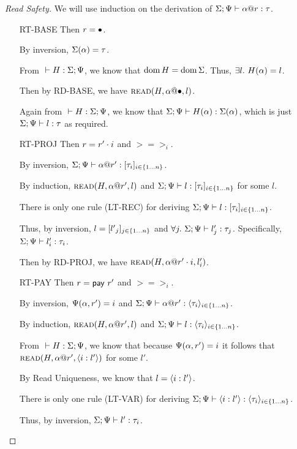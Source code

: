 \begin{proof}[Read Safety]
  We will use induction on the derivation of ${\Sigma;\Psi} \vdash {{\alpha}@{r}} : {\tau}$.
  \begin{itemize}
    \item[\textsc{RT-BASE}] Then $r = \bullet$.

      By inversion, $\Sigma(\alpha)=\tau$.

      From ${} \vdash {H} : {\Sigma;\Psi}$, we know that $\operatorname{dom}{H}=\operatorname{dom}{\Sigma}$.
      Thus, $\exists l.~H(\alpha)=l$.

      Then by \textsc{RD-BASE}, we have $\textsc{read}({H},{{\alpha}@{\bullet}},{l})$.

      Again from ${} \vdash {H} : {\Sigma;\Psi}$, we know that ${\Sigma;\Psi} \vdash {H(\alpha)} : {\Sigma(\alpha)}$,
      which is just ${\Sigma;\Psi} \vdash {l} : {\tau}$ as required.
    \item[\textsc{RT-PROJ}] Then $r = {r'}\cdot{i}$ and $\gt = \gt_i$.

      By inversion, ${\Sigma;\Psi} \vdash {{\alpha}@{r'}} : {[{{\tau}_{i}}]_{{i} \in \{1 \ldots {n}\} }}$.

      By induction, $\textsc{read}({H},{{\alpha}@{r'}},{l})$
      and ${\Sigma;\Psi} \vdash {l} : {[{{\tau}_{i}}]_{{i} \in \{1 \ldots {n}\} }}$ for some $l$.

      There is only one rule (\textsc{LT-REC}) for deriving ${\Sigma;\Psi} \vdash {l} : {[{{\tau}_{i}}]_{{i} \in \{1 \ldots {n}\} }}$.

      Thus, by inversion, $l = [{{l'}_{j}}]_{{j} \in \{1 \ldots {n}\} }$ 
      and $\forall j.~{\Sigma;\Psi} \vdash {l'_j} : {\tau_j}$.
      Specifically, ${\Sigma;\Psi} \vdash {l'_i} : {\tau_i}$.

      Then by \textsc{RD-PROJ}, we have $\textsc{read}({H},{{\alpha}@{{r'}\cdot{i}}},{l'_i})$.
    \item[\textsc{RT-PAY}] Then $r = \mathsf{pay}~{r'}$ and $\gt = \gt_i$.

      By inversion, $\Psi(\alpha,r')=i$ and ${\Sigma;\Psi} \vdash {{\alpha}@{r'}} : {\langle{{\tau}_{i}}\rangle_{{i} \in \{1 \ldots {n}\} }}$.

      By induction, $\textsc{read}({H},{{\alpha}@{r'}},{l})$
      and ${\Sigma;\Psi} \vdash {l} : {\langle{{\tau}_{i}}\rangle_{{i} \in \{1 \ldots {n}\} }}$.

      From ${} \vdash {H} : {\Sigma;\Psi}$, we know that because $\Psi(\alpha,r')=i$
      it follows that $\textsc{read}({H},{{\alpha}@{r'}},{\langle{{i}:{l'}}\rangle})$ for some $l'$.

      By Read Uniqueness, we know that $l = \langle{{i}:{l'}}\rangle$.

      There is only one rule (\textsc{LT-VAR}) for deriving 
      ${\Sigma;\Psi} \vdash {\langle{{i}:{l'}}\rangle} : {\langle{{\tau}_{i}}\rangle_{{i} \in \{1 \ldots {n}\} }}$.

      Thus, by inversion, ${\Sigma;\Psi} \vdash {l'} : {\tau_i}$.


\end{itemize}
\end{proof}
